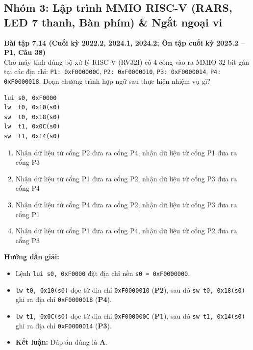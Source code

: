 \subsection{Nhóm 3: Lập trình MMIO RISC-V (RARS, LED 7 thanh, Bàn phím) \& Ngắt ngoại vi}

\textbf{Bài tập 7.14 (Cuối kỳ 2022.2, 2024.1, 2024.2; Ôn tập cuối kỳ 2025.2 -- P1, Câu 38)}\\
Cho máy tính dùng bộ xử lý RISC-V (RV32I) có 4 cổng vào-ra MMIO 32-bit gán tại các địa chỉ: \texttt{P1: 0xF000000C}, \texttt{P2: 0xF0000010}, \texttt{P3: 0xF0000014}, \texttt{P4: 0xF0000018}. Đoạn chương trình hợp ngữ sau thực hiện nhiệm vụ gì?
\begin{lstlisting}
lui s0, 0xF0000
lw  t0, 0x10(s0)
sw  t0, 0x18(s0)
lw  t1, 0x0C(s0)
sw  t1, 0x14(s0)
\end{lstlisting}
\begin{enumerate}[label=\Alph*.]
    \item Nhận dữ liệu từ cổng P2 đưa ra cổng P4, nhận dữ liệu từ cổng P1 đưa ra cổng P3
    \item Nhận dữ liệu từ cổng P1 đưa ra cổng P2, nhận dữ liệu từ cổng P3 đưa ra cổng P4
    \item Nhận dữ liệu từ cổng P4 đưa ra cổng P2, nhận dữ liệu từ cổng P3 đưa ra cổng P1
    \item Nhận dữ liệu từ cổng P1 đưa ra cổng P4, nhận dữ liệu từ cổng P2 đưa ra cổng P3
\end{enumerate}
\textbf{Hướng dẫn giải:}
\begin{itemize}
    \item Lệnh \texttt{lui s0, 0xF0000} đặt địa chỉ nền \texttt{s0 = 0xF0000000}.
    \item \texttt{lw t0, 0x10(s0)} đọc từ địa chỉ \texttt{0xF0000010} (\textbf{P2}), sau đó \texttt{sw t0, 0x18(s0)} ghi ra địa chỉ \texttt{0xF0000018} (\textbf{P4}).
    \item \texttt{lw t1, 0x0C(s0)} đọc từ địa chỉ \texttt{0xF000000C} (\textbf{P1}), sau đó \texttt{sw t1, 0x14(s0)} ghi ra địa chỉ \texttt{0xF0000014} (\textbf{P3}).
    \item \textbf{Kết luận:} Đáp án đúng là \textbf{A}.
\end{itemize}

